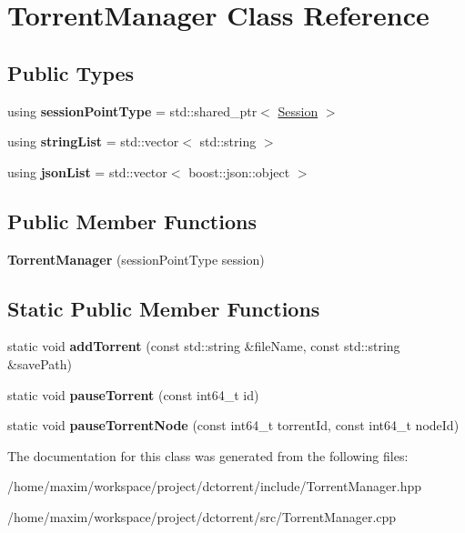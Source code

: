 \hypertarget{class_torrent_manager}{}\section{Torrent\+Manager Class Reference}
\label{class_torrent_manager}
\subsection*{Public Types}
\begin{DoxyCompactItemize}
\item 
\mbox{\label{class_torrent_manager_a696dfbbcd1e56b05c61e7b9e972fac67}} 
using {\bfseries session\+Point\+Type} = std\+::shared\+\_\+ptr$<$ \hyperlink{class_session}{Session} $>$
\item 
\mbox{\label{class_torrent_manager_a0ec9f47e42f2a33e4f83f129040a9403}} 
using {\bfseries string\+List} = std\+::vector$<$ std\+::string $>$
\item 
\mbox{\label{class_torrent_manager_a5e0f9e43eb4fb3261f6d7de86b176e11}} 
using {\bfseries json\+List} = std\+::vector$<$ boost\+::json\+::object $>$
\end{DoxyCompactItemize}
\subsection*{Public Member Functions}
\begin{DoxyCompactItemize}
\item 
\mbox{\label{class_torrent_manager_a448fade6680b6a33d5ddf71ee054c1cd}} 
{\bfseries Torrent\+Manager} (session\+Point\+Type session)
\end{DoxyCompactItemize}
\subsection*{Static Public Member Functions}
\begin{DoxyCompactItemize}
\item 
\mbox{\label{class_torrent_manager_ae0b16a0a68064229f1f69f154f5b337e}} 
static void {\bfseries add\+Torrent} (const std\+::string \&file\+Name, const std\+::string \&save\+Path)
\item 
\mbox{\label{class_torrent_manager_a001407bb99faad4ece4b1e6d131c8eac}} 
static void {\bfseries pause\+Torrent} (const int64\+\_\+t id)
\item 
\mbox{\label{class_torrent_manager_a0ee14a11a61ee8e343821d329a455ae3}} 
static void {\bfseries pause\+Torrent\+Node} (const int64\+\_\+t torrent\+Id, const int64\+\_\+t node\+Id)
\end{DoxyCompactItemize}


The documentation for this class was generated from the following files\+:\begin{DoxyCompactItemize}
\item 
/home/maxim/workspace/project/dctorrent/include/Torrent\+Manager.\+hpp\item 
/home/maxim/workspace/project/dctorrent/src/Torrent\+Manager.\+cpp\end{DoxyCompactItemize}
